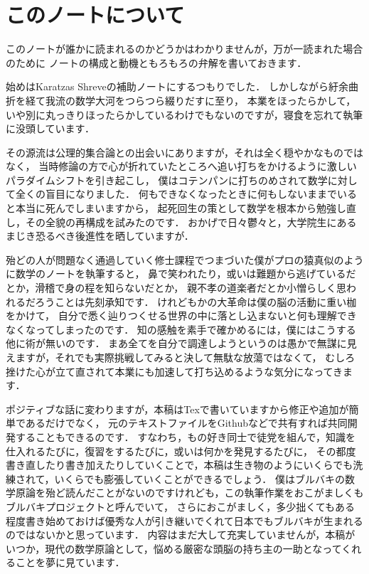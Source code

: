 \chapter*{このノートについて}

このノートが誰かに読まれるのかどうかはわかりませんが，万が一読まれた場合のために
ノートの構成と動機ともろもろの弁解を書いておきます．

始めはKaratzas Shreveの補助ノートにするつもりでした．
しかしながら紆余曲折を経て我流の数学大河をつらつら綴りだすに至り，
本業をほったらかして，いや別に丸っきりほったらかしているわけでもないのですが，寝食を忘れて執筆に没頭しています．

その源流は公理的集合論との出会いにありますが，それは全く穏やかなものではなく，
当時修論の方で心が折れていたところへ追い打ちをかけるように激しいパラダイムシフトを引き起こし，
僕はコテンパンに打ちのめされて数学に対して全くの盲目になりました．
何もできなくなったときに何もしないままでいると本当に死んでしまいますから，
起死回生の策として数学を根本から勉強し直し，その全貌の再構成を試みたのです．
おかげで日々鬱々と，大学院生にあるまじき恐るべき後進性を晒していますが．

殆どの人が問題なく通過していく修士課程でつまづいた僕がプロの猿真似のように数学のノートを執筆すると，
鼻で笑われたり，或いは難題から逃げているだとか，滑稽で身の程を知らないだとか，
親不孝の道楽者だとか小憎らしく思われるだろうことは先刻承知です．
けれどもかの大革命は僕の脳の活動に重い枷をかけて，
自分で悉く辿りつくせる世界の中に落とし込まないと何も理解できなくなってしまったのです．
知の感触を素手で確かめるには，僕にはこうする他に術が無いのです．
まあ全てを自分で調達しようというのは愚かで無謀に見えますが，それでも実際挑戦してみると決して無駄な放蕩ではなくて，
むしろ挫けた心が立て直されて本業にも加速して打ち込めるような気分になってきます．

ポジティブな話に変わりますが，本稿はTexで書いていますから修正や追加が簡単であるだけでなく，
元のテキストファイルをGithubなどで共有すれば共同開発することもできるのです．
すなわち，もの好き同士で徒党を組んで，知識を仕入れるたびに，復習をするたびに，或いは何かを発見するたびに，
その都度書き直したり書き加えたりしていくことで，本稿は生き物のようにいくらでも洗練されて，いくらでも膨張していくことができるでしょう．
僕はブルバキの数学原論を殆ど読んだことがないのですけれども，この執筆作業をおこがましくもブルバキプロジェクトと呼んでいて，
さらにおこがましく，多少拙くてもある程度書き始めておけば優秀な人が引き継いでくれて日本でもブルバキが生まれるのではないかと思っています．
内容はまだ大して充実していませんが，本稿がいつか，現代の数学原論として，悩める厳密な頭脳の持ち主の一助となってくれることを夢に見ています．

